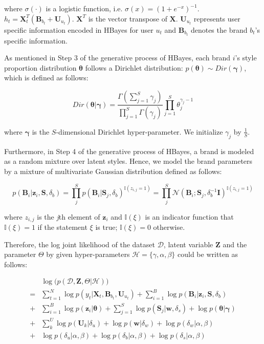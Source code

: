 \noindent where $\sigma(\cdot)$ is a logistic function, i.e. $\sigma(x)=(1+e^{-x})^{-1}$. $h_{t}=\bm{X}_t^T(\bm{B}_{b_t}+\bm{U}_{u_t})$. $\mathbf{X}^T$ is the vector transpose of $\mathbf{X}$. $\bm{U}_{u_t}$ represents user specific information encoded in HBayes for user $u_t$ and $\bm{B}_{b_t}$ denotes the brand $b_t$'s specific information.

As mentioned in Step 3 of the generative process of HBayes, each brand $i$'s style proportion distribution $\boldsymbol{\theta}$ follows a Dirichlet distribution: $p(\boldsymbol{\theta}) \sim Dir(\boldsymbol{\gamma})$, which is defined as follows: 

\begin{equation*}
Dir(\bm{\theta}|\bm{\gamma})=\frac{\Gamma(\sum_{j=1}^{S}\gamma_j)}{\prod_{j=1}^{S}\Gamma(\gamma_j)}\prod_{j=1}^S \theta_j^{\gamma_j-1}
\end{equation*}

\noindent where $\bm{\gamma}$ is the $S$-dimensional Dirichlet hyper-parameter. We initialize $\gamma_j$ by $\frac{1}{S}$. 

Furthermore, in Step 4 of the generative process of HBayes, a brand is modeled as a random mixture over latent styles. Hence, we model the brand parameters by a mixture of multivariate Gaussian distribution defined as follows:

\begin{equation*}
p(\bm{B}_i|\bm{z}_i,\bm{S},\delta_b) = \prod_{j}^S p(\bm{B}_i|\bm{S}_j,\delta_b)^{\mathbb{I}(z_{i,j}=1)} = \prod_{j}^S \mathcal{N}(\bm{B}_i; \bm{S}_j,\delta_b^{-1}\mathbf{I}) ^{\mathbb{I}(z_{i,j}=1)}
\end{equation*}

\noindent where $z_{i,j}$ is the \emph{j}th element of $\mathbf{z}_i$ and $\mathbb{I}(\xi)$ is an indicator function that $\mathbb{I}(\xi)=1$ if the statement $\xi$ is true; $\mathbb{I}(\xi)=0$ otherwise.

Therefore, the log joint likelihood of the dataset $\mathcal{D}$, latent variable $\bm{Z}$ and the parameter $\Theta$ by given hyper-parameters $\mathcal{H} = \{\gamma, \alpha,\beta\}$ could be written as follows:

\begin{align}
 & \log \big( p(\mathcal{D},\bm{Z},\Theta|\mathcal{H}) \big) \nonumber \\
= & \sum_{t=1}^N \log p(y_t|\bm{X}_t,\bm{B}_{b_t},\bm{U}_{u_t}) + \sum_{i=1}^B \log p(\bm{B}_i|\bm{z}_i,\bm{S},\delta_b)  \nonumber \\
+ & \sum_{i=1}^B \log p(\bm{z}_{i}|\bm{\theta}) + \sum_{j=1}^S \log p(\bm{S}_j|\bm{w},\delta_s) + \log p(\bm{\theta}|\bm{\gamma})   \nonumber \\
+ & \sum_{k}^U \log p(\bm{U}_k|\delta_u) + \log p(\bm{w}|\delta_w) +  \log p(\delta_w|\alpha,\beta) \nonumber  \\
+ & \log p(\delta_u|\alpha,\beta) + \log p(\delta_b|\alpha,\beta) + \log p(\delta_s|\alpha,\beta)
\label{eq:log_likelihood}
\end{align}


